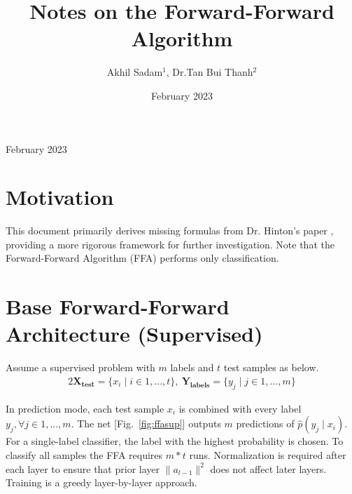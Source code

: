 \documentclass[12pt]{iopart}
\theoremstyle{break}
\begin{document}
\date{February 2023}
\title{Notes on the Forward-Forward Algorithm}
\author{Akhil Sadam$^1$, Dr.Tan Bui Thanh$^2$}
\address{$^1$Department of Aerospace Engineering and Engineering Mechanics, UT Austin\\$^2$The Oden Institute for Computational Sciences, UT Austin}
\begin{indented}
\item[]February 2023
\end{indented}
\section{Motivation}
This document primarily derives missing formulas from Dr. Hinton's paper \cite{FFA23}, providing a more rigorous framework for further investigation.
Note that the Forward-Forward Algorithm (FFA) performs only classification.
\section{Base Forward-Forward Architecture (Supervised)}
Assume a supervised problem with $m$ labels and $t$ test samples as below.
\begin{alignat}{2}
\mathbf{X_{test}} = \{x_i \mid i \in 1,...,t \},\ \mathbf{Y_{labels}} = \{y_j \mid j \in 1,...,m \}
\end{alignat}

\begin{figure}[htpb]
\centering


\end{figure}

In prediction mode, each test sample $x_i$ is combined with every label $y_j, \forall j\in 1,...,m$. The net [Fig.~\ref{fig:ffasup}] outputs $m$ predictions of $\hat{p}(y_j \mid x_i)$.
For a single-label classifier, the label with the highest probability is chosen.
To classify all samples the FFA requires $m*t$ runs.
Normalization is required after each layer to ensure that prior layer $\|a_{l-1}\|^2$ does not affect later layers.
Training is a greedy layer-by-layer approach.
\end{document}
